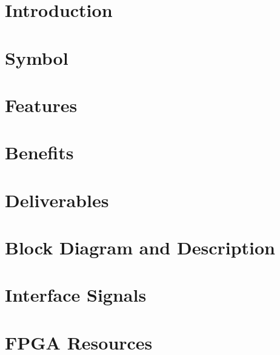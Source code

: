 \documentclass{../../submodules/TEX/document/ug/ug}
\begin{document}
\maketitle
\cleardoublepage
\tableofcontents
\listoftables
\listoffigures
\cleardoublepage

\section{Introduction}


\section{Symbol}


\section{Features}


\section{Benefits}


\section{Deliverables}


\section{Block Diagram and Description}


\section{Interface Signals}


\ifnum{}

\fi


\ifnum{}

\fi

\ifnum{}

\fi

\ifnum{}

\fi

\section*{FPGA Resources}


\ifnum{}

\fi

%
%
\end{document}

